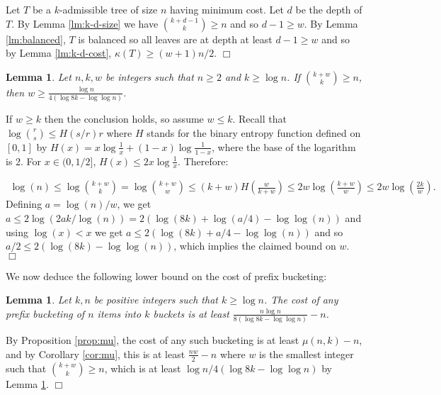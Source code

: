 \documentclass[11pt]{article}
\newtheorem{lemma}[theorem]{Lemma}
\newcommand{\qed}{$\Box$}
\newenvironment{proof}{\noindent {\bf Proof:}}{\hfill \qed \smallskip}
\begin{document}
\begin{proof}
Let $T$ be a $k$-admissible tree of size $n$ having minimum cost.  Let $d$ be the depth of $T$.
By Lemma \ref{lm:k-d-size} we have
$\binom{k+d-1}{k} \geq n$ and so $d-1 \geq w$.
By Lemma \ref{lm:balanced}, $T$ is balanced so all leaves are at depth at least $d-1\geq w$ and so
by Lemma \ref{lm:k-d-cost}, $\kappa(T) \geq (w+1)n/2$.  
\end{proof}

\begin{lemma} \label{lm:lower_bound_d}
Let $n,k,w$ be integers such that $n\ge 2$ and $k \ge \log n$.  If $\binom{k+w}{k} \geq n$,
then $w \ge \frac{\log n}{ 4 (\log 8k - \log\log n)}$.
\end{lemma}
\begin{proof}
If $w \geq k$ then the conclusion holds, so assume $w \leq k$.
Recall that $\log\binom{r}{s} \leq {H(s/r) r}$
where $H$ stands for the binary entropy function
defined on $[0,1]$ by $H(x) = x \log\frac{1}{x} + (1-x) \log\frac{1}{1-x}$, where the base of the logarithm is 2.
For $x \in (0,1/2]$, $H(x) \le 2x \log\frac{1}{x}$. Therefore:
	
	\begin{align*}
	\log(n) \leq \log{k+w \choose k} = \log {k+w \choose w} \leq (k+w)H\left(\frac{w}{k + w}\right)  \leq 
2w\log\left(\frac{k + w}{w}\right) \leq 2w\log\left(\frac{2k}{w}\right).
	\end{align*}
Defining $a=\log(n)/w$, we get $a \leq 2\log(2ak/\log(n))=2(\log(8k)+\log(a/4)-\log\log(n))$
and using $\log(x)<x$ we get $a \leq 2(\log(8k)+a/4 -\log\log(n))$ and so $a/2 \leq 2(\log(8k)-\log\log(n))$, which
implies the claimed bound on $w$.
\end{proof}


We  now deduce the following lower bound on the cost of prefix bucketing:
\begin{lemma}\label{l-lbb}
Let $k,n$ be positive integers such that $k \ge \log n$.
The cost of any prefix bucketing of $n$ items into $k$ buckets is at least $\frac{n \log n}{8 (\log 8k - \log \log n)} - n$.
\end{lemma}

\begin{proof}
By Proposition \ref{prop:mu}, the cost of any such bucketing is at least $\mu(n,k)-n$, and by Corollary \ref{cor:mu},
this is at least $\frac{nw}{2}-n$ where $w$ is the smallest integer such that $\binom{k+w}{k} \geq n$, which is at
least $\log n/4(\log 8k -\log\log n)$ by Lemma \ref{lm:lower_bound_d}.
\end{proof}
\end{document}
